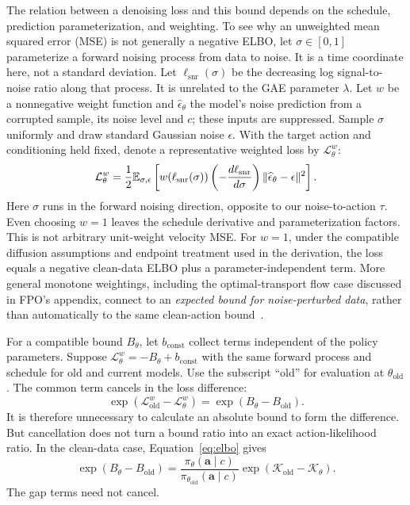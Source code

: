 The relation between a denoising loss and this bound depends on the schedule, prediction parameterization, and weighting. To see why an unweighted mean squared error (MSE) is not generally a negative ELBO, let $\sigma\in[0,1]$ parameterize a forward noising process from data to noise. It is a time coordinate here, not a standard deviation. Let $\ell_{\mathrm{snr}}(\sigma)$ be the decreasing log signal-to-noise ratio along that process. It is unrelated to the GAE parameter $\lambda$. Let $w$ be a nonnegative weight function and $\widehat\epsilon_\theta$ the model's noise prediction from a corrupted sample, its noise level and $c$; these inputs are suppressed. Sample $\sigma$ uniformly and draw standard Gaussian noise $\epsilon$. With the target action and conditioning held fixed, denote a representative weighted loss by $\mathcal L^w_\theta$:
\begin{equation}
 \mathcal L^w_\theta=\frac12\mathbb{E}_{\sigma,\epsilon}
 \left[w(\ell_{\mathrm{snr}}(\sigma))\left(-\frac{d\ell_{\mathrm{snr}}}{d\sigma}\right)
 \|\widehat\epsilon_\theta-\epsilon\|^2\right].
 \label{eq:weighted}
\end{equation}
Here $\sigma$ runs in the forward noising direction, opposite to our noise-to-action $\tau$. Even choosing $w=1$ leaves the schedule derivative and parameterization factors. This is not arbitrary unit-weight velocity MSE. For $w=1$, under the compatible diffusion assumptions and endpoint treatment used in the derivation, the loss equals a negative clean-data ELBO plus a parameter-independent term. More general monotone weightings, including the optimal-transport flow case discussed in FPO's appendix, connect to an \emph{expected bound for noise-perturbed data}, rather than automatically to the same clean-action bound~\citep{fpo,kingma}.

For a compatible bound $B_\theta$, let $b_{\mathrm{const}}$ collect terms independent of the policy parameters. Suppose $\mathcal L^w_\theta=-B_\theta+b_{\mathrm{const}}$ with the same forward process and schedule for old and current models. Use the subscript ``old'' for evaluation at $\theta_{\mathrm{old}}$. The common term cancels in the loss difference:
\begin{equation}
 \exp(\mathcal L^w_{\mathrm{old}}-\mathcal L^w_\theta)
 =\exp(B_\theta-B_{\mathrm{old}}).
 \label{eq:cancel}
\end{equation}
It is therefore unnecessary to calculate an absolute bound to form the difference. But cancellation does not turn a bound ratio into an exact action-likelihood ratio. In the clean-data case, Equation~\eqref{eq:elbo} gives
\begin{equation}
 \exp(B_\theta-B_{\mathrm{old}})
 =\frac{\pi_\theta(\mathbf a\mid c)}{\pi_{\theta_{\mathrm{old}}}(\mathbf a\mid c)}
   \exp(\mathcal K_{\mathrm{old}}-\mathcal K_\theta).
 \label{eq:gap}
\end{equation}
The gap terms need not cancel.

